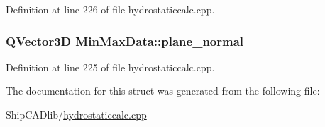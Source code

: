 Definition at line 226 of file hydrostaticcalc.\-cpp.

\hypertarget{structMinMaxData_a62b4b4d97aba034731cdb0f11b23d856}{
\subsubsection[{plane\-\_\-normal}]{\setlength{\rightskip}{0pt plus 5cm}Q\-Vector3\-D Min\-Max\-Data\-::plane\-\_\-normal}}\label{structMinMaxData_a62b4b4d97aba034731cdb0f11b23d856}


Definition at line 225 of file hydrostaticcalc.\-cpp.



The documentation for this struct was generated from the following file\-:\begin{DoxyCompactItemize}
\item 
Ship\-C\-A\-Dlib/\hyperlink{hydrostaticcalc_8cpp}{hydrostaticcalc.\-cpp}\end{DoxyCompactItemize}
